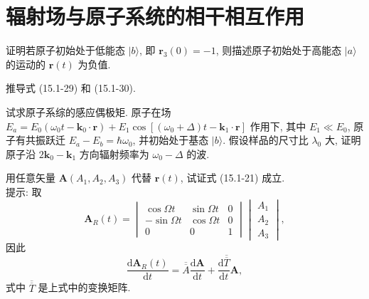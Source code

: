 \documentclass{note}
\begin{document}
\fi
\setcounter{chapter}{14}
\chapter{辐射场与原子系统的相干相互作用}
\begin{exe}
    证明若原子初始处于低能态 $\lvert b\rangle$, 即 $\bm{r}_3(0)=-1$, 则描述原子初始处于高能态 $\lvert a\rangle$ 的运动的 $\bm{r}(t)$ 为负值.
\end{exe}
\begin{pf}

\end{pf}

\begin{exe}
    推导式 (15.1-29) 和 (15.1-30).
\end{exe}
\begin{pf}
    
\end{pf}

\begin{exe}
    试求原子系综的感应偶极矩. 原子在场 $E_a=E_0(\omega_0t-\bm{k}_0\cdot\bm{r})+E_1\cos[(\omega_0+\Delta)t-\bm{k}_1\cdot\bm{r}]$ 作用下, 其中 $E_1\ll E_0$, 原子有共振跃迁 $E_a-E_b=\hbar\omega_0$, 并初始处于基态 $\lvert b\rangle$. 假设样品的尺寸比 $\lambda_0$ 大, 证明原子沿 $2\bm{k}_0-\bm{k}_1$ 方向辐射频率为 $\omega_0-\Delta$ 的波.
\end{exe}
\begin{sol}

\end{sol}

\begin{exe}
    用任意矢量 $\bm{A}(A_1,A_2,A_3)$ 代替 $\bm{r}(t)$, 试证式 (15.1-21) 成立.\\
    提示: 取
    \[
        \bm{A}_{R}(t)=\begin{vmatrix}
            \cos\Omega t&\sin\Omega t&0\\
            -\sin\Omega t&\cos\Omega t&0\\
            0&0&1
        \end{vmatrix}\begin{vmatrix}
            A_1\\
            A_2\\
            A_3
        \end{vmatrix},
    \]
    因此
    \[
        \frac{\mathrm{d}\bm{A}_R(t)}{\mathrm{d}t}=\overline{\overline{A}}\frac{\mathrm{d}\bm{A}}{\mathrm{d}t}+\frac{\mathrm{d}\overline{\overline{T}}}{\mathrm{d}t}\bm{A},
    \]
    式中 $\overline{\overline{T}}$ 是上式中的变换矩阵.
\end{exe}
\begin{pf}
    
\end{pf}
\ifx\allfiles\undefined
\end{document}
